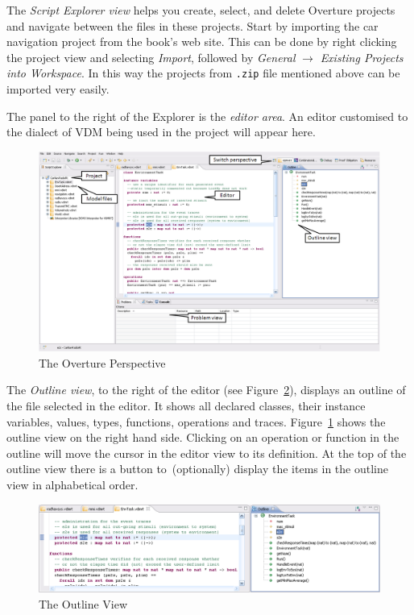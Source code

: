 The \emph{Script Explorer view} helps you create, select, and delete
Overture projects and navigate between the files in these
projects. Start by importing the car navigation project from the
book's web site. This can be done by right clicking the project view
and selecting \emph{Import}, followed by \emph{General} $\rightarrow$
\emph{Existing Projects into Workspace}.  In this way the projects
from \texttt{.zip} file mentioned above can be imported very easily.

The panel to the right of the Explorer is the \emph{editor area}. An
editor customised to the dialect of VDM being used in the project will
appear here.

\begin{figure}[!htb]
\begin{center}
  \includegraphics[width=4.5in]{figures/OverturePerspectiveRT}
  \caption[labelInTOC]{The Overture Perspective}
  \label{fig:userguire:OverturePerspective}
\end{center}
\end{figure}

The \emph{Outline view}, to the right of the editor (see
Figure~\ref{fig:userguide:OutlineView}), displays an outline of the
file selected in the editor. It shows all declared classes, their
instance variables, values, types, functions, operations and traces.
Figure~\ref{fig:userguire:OverturePerspective} shows the outline view
on the right hand side. Clicking on an operation or function in the
outline will move the cursor in the editor view to its definition. At
the top of the outline view there is a button to~(optionally) display
the items in the outline view in alphabetical order.

\begin{figure}[!h]
\begin{center}
  \includegraphics[width=4.5in]{figures/OutlineViewRT}
  \caption[labelInTOC]{The Outline View}
  \label{fig:userguide:OutlineView}
\end{center}
\end{figure}

